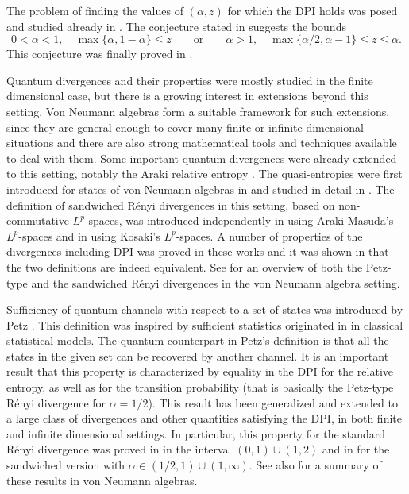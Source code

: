 \documentclass[12pt]{article}
\theoremstyle{definition}
\theoremstyle{remark}
\numberwithin{equation}{section}
\begin{document}
The problem of finding the values of $(\alpha,z)$ for which the DPI holds was posed and studied
already in \cite{audenaert2015alpha}. The conjecture stated in
\cite{carlen2018inequalities} suggests the bounds
\[
0<\alpha<1, \quad \max\{\alpha,1-\alpha\}\le z\qquad \text{or}\qquad \alpha>1,\quad
\max\{{\alpha/2},\alpha-1\}\le z\le \alpha.
\]
This conjecture was finally proved in \cite{zhang2020fromwyd}.


Quantum divergences and their properties were mostly studied in the finite dimensional
case, but there is a growing interest in extensions beyond this setting. Von Neumann
algebras form a suitable framework for such extensions, since they are general enough to
cover many finite or infinite dimensional situations and there are also strong mathematical
tools and techniques available to deal with them. Some important quantum divergences were
already extended to this setting, notably the Araki relative entropy \cite{araki1976relative}. The
quasi-entropies were first introduced for states of von Neumann algebras in
\cite{petz1985quasi} and studied in detail in \cite{hiai2018quantum}. The definition of sandwiched
R\'enyi divergences in this setting, based on non-commutative $L^p$-spaces,  was
introduced independently in \cite{berta2018renyi}  using Araki-Masuda's $L^p$-spaces and
in \cite{jencova2018renyi,jencova2021renyi} using Kosaki's $L^p$-spaces. A number of
properties of the divergences including DPI was proved in these works and it was shown in
\cite{jencova2018renyi} that the two definitions are indeed equivalent. See \cite{hiai2021quantum} for
an overview of both the Petz-type and the sandwiched R\'enyi divergences in the
von Neumann algebra setting.

Sufficiency of quantum channels with respect to a set of states was introduced by Petz
\cite{petz1986sufficient,petz1988sufficiency}. This definition was inspired by sufficient statistics
originated in \cite{halmos1949application,kullback1951oninformation}
in classical statistical models. The quantum counterpart in Petz's definition is that all
the states in the given set can be recovered by another channel. It is an important result
that this property is characterized by equality in the DPI for the relative entropy, as well
as for the transition probability (that is basically the Petz-type R\'enyi divergence for
$\alpha=1/2$). This result has been generalized and extended to a large class of
divergences and other quantities satisfying the DPI, in both finite and infinite
dimensional settings. In particular, this property 
for the standard R\'enyi divergence was proved in \cite{hiai2017different} in the interval $(0,1)\cup(1,2)$
and in \cite{jencova2017preservation, jencova2018renyi, jencova2021renyi} for the sandwiched version
with $\alpha\in(1/2,1)\cup(1,\infty)$. See also \cite{hiai2021quantum} for a summary of these results
in von Neumann algebras.  
\end{document}
